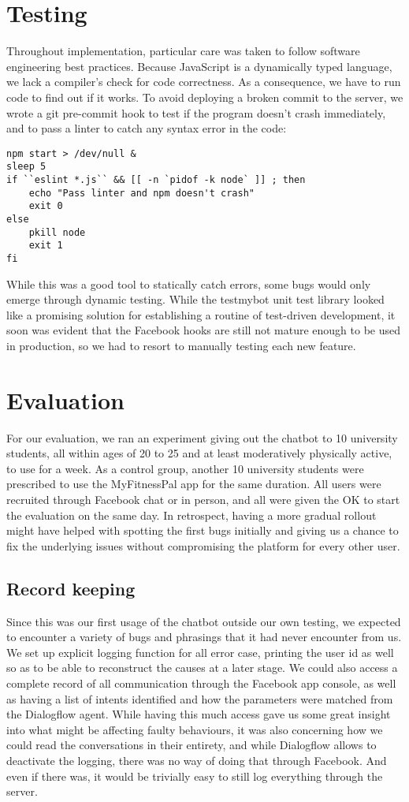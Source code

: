 \section{Testing}
Throughout implementation, particular care was taken to follow software engineering best practices. Because JavaScript is a dynamically typed language, we lack a compiler's check for code correctness. As a consequence, we have to run code to find out if it works. To avoid deploying a broken commit to the server, we wrote a git pre-commit hook to test if the program doesn't crash immediately, and to pass a linter to catch any syntax error in the code:
\begin{lstlisting}
npm start > /dev/null &
sleep 5
if ``eslint *.js`` && [[ -n `pidof -k node` ]] ; then
    echo "Pass linter and npm doesn't crash"
    exit 0
else
    pkill node
    exit 1
fi
\end{lstlisting}
While this was a good tool to statically catch errors, some bugs would only emerge through dynamic testing. While the testmybot unit test library looked like a promising solution for establishing a routine of test-driven development, it soon was evident that the Facebook hooks are still not mature enough to be used in production, so we had to resort to manually testing each new feature.
\section{Evaluation}
For our evaluation, we ran an experiment giving out the chatbot to 10 university students, all within ages of 20 to 25 and at least moderatively physically active, to use for a week. As a control group, another 10 university students were prescribed to use the MyFitnessPal app for the same duration. All users were recruited through Facebook chat or in person, and all were given the OK to start the evaluation on the same day. In retrospect, having a  more gradual rollout might have helped with spotting the first bugs initially and giving us a chance to fix the underlying issues without compromising the platform for every other user.
\subsection{Record keeping}
Since this was our first usage of the chatbot outside our own testing, we expected to encounter a variety of bugs and phrasings that it had never encounter from us. We set up explicit logging function for all error case, printing the user id as well so as to be able to reconstruct the causes at a later stage. We could also access a complete record of all communication through the Facebook app console, as well as having a list of intents identified and how the parameters were matched from the Dialogflow agent. While having this much access gave us some great insight into what might be affecting faulty behaviours, it was also concerning how we could read the conversations in their entirety, and while Dialogflow allows to deactivate the logging, there was no way of doing that through Facebook. And even if there was, it would be trivially easy to still log everything through the server.



